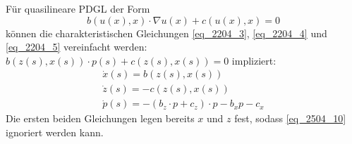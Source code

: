 \begin{bem} \label{bem_10}
	Für quasilineare PDGL der Form \marginnote{[10]}
	\[ b(u(x),x) \cdot \nabla u(x) + c(u(x),x) = 0 \]
	können die charakteristischen Gleichungen \eqref{eq_2204_3}, \eqref{eq_2204_4} und \eqref{eq_2204_5} vereinfacht werden: $b(z(s),x(s)) \cdot p(s) + c(z(s),x(s)) = 0$ impliziert:
	\begin{align}
		\dot{x}(s) = b(z(s),x(s))	\label{eq_2504_8} \\
		\dot{z}(s) = -c(z(s),x(s))	\label{eq_2504_9} \\
		\dot{p}(s) = -(b_z \cdot p + c_z)\cdot p - b_x p -c_x	\label{eq_2504_10}
	\end{align}
	Die ersten beiden Gleichungen legen bereits $x$ und $z$ fest, sodass \eqref{eq_2504_10} ignoriert werden kann.
\end{bem}
\newpage